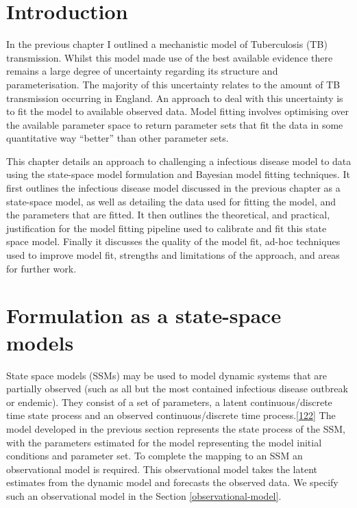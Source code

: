\documentclass[11pt,twoside]{bristolthesis}
\begin{document}
  \hypertarget{introduction-7}{%
  \section{Introduction}\label{introduction-7}}
  
  In the previous chapter I outlined a mechanistic model of Tuberculosis (TB) transmission. Whilst this model made use of the best available evidence there remains a large degree of uncertainty regarding its structure and parameterisation. The majority of this uncertainty relates to the amount of TB transmission occurring in England. An approach to deal with this uncertainty is to fit the model to available observed data. Model fitting involves optimising over the available parameter space to return parameter sets that fit the data in some quantitative way ``better'' than other parameter sets.
  
  This chapter details an approach to challenging a infectious disease model to data using the state-space model formulation and Bayesian model fitting techniques. It first outlines the infectious disease model discussed in the previous chapter as a state-space model, as well as detailing the data used for fitting the model, and the parameters that are fitted. It then outlines the theoretical, and practical, justification for the model fitting pipeline used to calibrate and fit this state space model. Finally it discusses the quality of the model fit, ad-hoc techniques used to improve model fit, strengths and limitations of the approach, and areas for further work.
  
  \hypertarget{formulation-as-a-state-space-models}{%
  \section{Formulation as a state-space models}\label{formulation-as-a-state-space-models}}
  
  State space models (SSMs) may be used to model dynamic systems that are partially observed (such as all but the most contained infectious disease outbreak or endemic). They consist of a set of parameters, a latent continuous/discrete time state process and an observed continuous/discrete time process.{[}\protect\hyperlink{ref-Murray2015}{122}{]} The model developed in the previous section represents the state process of the SSM, with the parameters estimated for the model representing the model initial conditions and parameter set. To complete the mapping to an SSM an observational model is required. This observational model takes the latent estimates from the dynamic model and forecasts the observed data. We specify such an observational model in the Section \ref{observational-model}.
  
\end{document}
